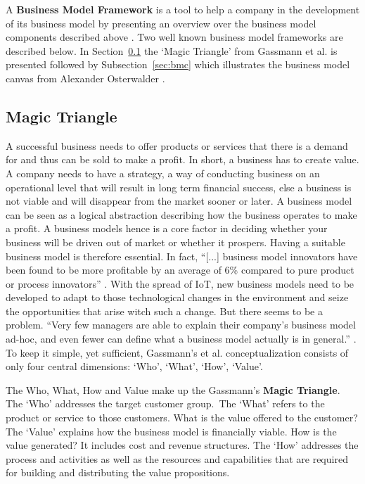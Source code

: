  		A \textbf{Business Model Framework} is a tool to help a company in the development of its business model by presenting an overview over the business model components described above \cite{dijkman}. Two well known business model frameworks are described below. In Section~\ref{sec:mt} the `Magic Triangle' from Gassmann et al. \cite{gassmann55} is presented followed by Subsection~\ref{sec:bmc} which illustrates the business model canvas from Alexander Osterwalder \cite{osterwalder}.

	\subsection{Magic Triangle}
	\label{sec:mt}
		A successful business needs to offer products or services that there is a demand for and thus can be sold to make a profit. In short, a business has to create value. A company needs to have a strategy, a way of conducting business on an operational level that will result in long term financial success, else a business is not viable and will disappear from the market sooner or later. A business model can be seen as a logical abstraction describing how the business operates to make a profit. A business models hence is a core factor in deciding whether your business will be driven out of market or whether it prospers. Having a suitable business model is therefore essential. In fact, ``[...] business model innovators have been found to be more profitable by an average of 6\% compared to pure product or process innovators'' \cite[p.~90]{gassmann55}. With the spread of IoT, new business models need to be developed to adapt to those technological changes in the environment and seize the opportunities that arise witch such a change. But there seems to be a problem. ``Very few managers are able to explain their company's business model ad-hoc, and even fewer can define what a business model actually is in general.'' \cite[p.~90]{gassmann55}. To keep it simple, yet sufficient, Gassmann's et al. conceptualization consists of only four central dimensions: `Who', `What', `How', `Value'. 

		The Who, What, How and Value make up the Gassmann's \textbf{Magic Triangle}. The `Who' addresses the target customer group.~The `What' refers to the product or service to those customers. What is the value offered to the customer? The `Value' explains how the business model is financially viable. How is the value generated? It includes cost and revenue structures. The `How' addresses the process and activities as well as the resources and capabilities that are required for building and distributing the value propositions.		
					
